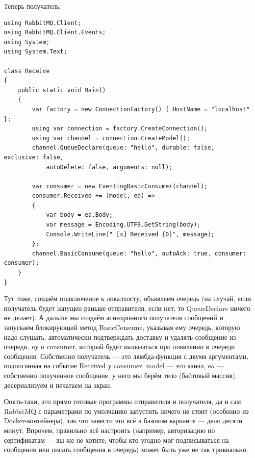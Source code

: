 \documentclass[a5paper]{article}
\begin{document}
Теперь получатель:

\begin{verbatim}
using RabbitMQ.Client;
using RabbitMQ.Client.Events;
using System;
using System.Text;

class Receive
{
    public static void Main()
    {
        var factory = new ConnectionFactory() { HostName = "localhost" };
        using var connection = factory.CreateConnection();
        using var channel = connection.CreateModel();
        channel.QueueDeclare(queue: "hello", durable: false, exclusive: false, 
            autoDelete: false, arguments: null);

        var consumer = new EventingBasicConsumer(channel);
        consumer.Received += (model, ea) =>
        {
            var body = ea.Body;
            var message = Encoding.UTF8.GetString(body);
            Console.WriteLine(" [x] Received {0}", message);
        };
        channel.BasicConsume(queue: "hello", autoAck: true, consumer: consumer);
    }
}
\end{verbatim}

Тут тоже, создаём подключение к локалхосту, объявляем очередь (на случай, если получатель будет запущен раньше отправителя, если нет, то QueueDeclare ничего не делает). А дальше мы создаём асинхронного получателя сообщений и запускаем блокирующий метод BasicConsume, указывая ему очередь, которую надо слушать, автоматически подтверждать доставку и удалять сообщение из очереди, ну и consumer, который будет вызываться при появлении в очереди сообщения. Собственно получатель --- это лямбда-функция с двумя аргументами, подписанная на событие Received у consumer. model --- это канал, ea --- собственно полученное сообщение, у него мы берём тело (байтовый массив), десериализуем и печатаем на экран.

Опять-таки, это прямо готовые программы отправителя и получателя, да и сам RabbitMQ с параметрами по умолчанию запустить ничего не стоит (особенно из Docker-контейнера), так что завести это всё в базовом варианте --- дело десяти минут. Впрочем, правильно всё настроить (например, авторизацию по сертификатам --- вы же не хотите, чтобы кто угодно мог подписываться на сообщения или писать сообщения в очередь) может быть уже не так тривиально.


\end{document}
